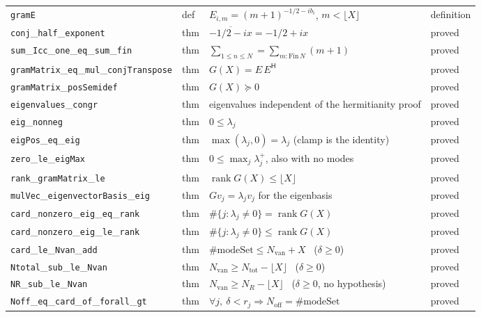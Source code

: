 \documentclass[11pt,a4paper]{article}
\newcommand{\lb}{\_\allowbreak}
\theoremstyle{definition}
\theoremstyle{remark}
\begin{document}
\begin{longtable}{@{}p{3.75cm}p{1.52cm}p{8.38cm}p{1.45cm}@{}}
\texttt{gramE} & def & $E_{i,m}=(m+1)^{-1/2-i b_i}$, $m<\lfloor X\rfloor$ & definition\\
\texttt{conj}\lb\texttt{half}\lb\texttt{exponent} & thm & $\overline{-1/2-ix}=-1/2+ix$ & proved\\
\texttt{sum}\lb\texttt{Icc}\lb\texttt{one}\lb\texttt{eq}\lb\texttt{sum}\lb\texttt{fin} & thm & $\sum_{1\le n\le N}=\sum_{m:\mathrm{Fin}\,N}(m+1)$ & proved\\
\texttt{gramMatrix}\lb\texttt{eq}\lb\texttt{mul}\lb\texttt{conjTranspose} & thm & $G(X)=E\,E^{\mathsf H}$ & proved\\
\texttt{gramMatrix}\lb\texttt{posSemidef} & thm & $G(X)\succeq0$ & proved\\
\texttt{eigenvalues}\lb\texttt{congr} & thm & eigenvalues independent of the hermitianity proof & proved\\
\texttt{eig}\lb\texttt{nonneg} & thm & $0\le\lambda_j$ & proved\\
\texttt{eigPos}\lb\texttt{eq}\lb\texttt{eig} & thm & $\max(\lambda_j,0)=\lambda_j$ (clamp is the identity) & proved\\
\texttt{zero}\lb\texttt{le}\lb\texttt{eigMax} & thm & $0\le\max_j\lambda_j^{+}$, also with no modes & proved\\
\texttt{rank}\lb\texttt{gramMatrix}\lb\texttt{le} & thm & $\operatorname{rank}G(X)\le\lfloor X\rfloor$ & proved\\
\texttt{mulVec}\lb\texttt{eigenvectorBasis}\lb\texttt{eig} & thm & $G v_j=\lambda_j v_j$ for the eigenbasis & proved\\
\texttt{card}\lb\texttt{nonzero}\lb\texttt{eig}\lb\texttt{eq}\lb\texttt{rank} & thm & $\#\{j:\lambda_j\ne0\}=\operatorname{rank}G(X)$ & proved\\
\texttt{card}\lb\texttt{nonzero}\lb\texttt{eig}\lb\texttt{le}\lb\texttt{rank} & thm & $\#\{j:\lambda_j\ne0\}\le\operatorname{rank}G(X)$ & proved\\
\texttt{card}\lb\texttt{le}\lb\texttt{Nvan}\lb\texttt{add} & thm & $\#\mathrm{modeSet}\le N_{\mathrm{van}}+X$ \ ($\delta\ge0$) & proved\\
\texttt{Ntotal}\lb\texttt{sub}\lb\texttt{le}\lb\texttt{Nvan} & thm & $N_{\mathrm{van}}\ge N_{\mathrm{tot}}-\lfloor X\rfloor$ \ ($\delta\ge0$) & proved\\
\texttt{NR}\lb\texttt{sub}\lb\texttt{le}\lb\texttt{Nvan} & thm & $N_{\mathrm{van}}\ge N_R-\lfloor X\rfloor$ \ ($\delta\ge0$, no hypothesis) & proved\\
\texttt{Noff}\lb\texttt{eq}\lb\texttt{card}\lb\texttt{of}\lb\texttt{forall}\lb\texttt{gt} & thm & $\forall j,\ \delta<r_j\Rightarrow N_{\mathrm{off}}=\#\mathrm{modeSet}$ & proved\\

\end{longtable}
\end{document}
